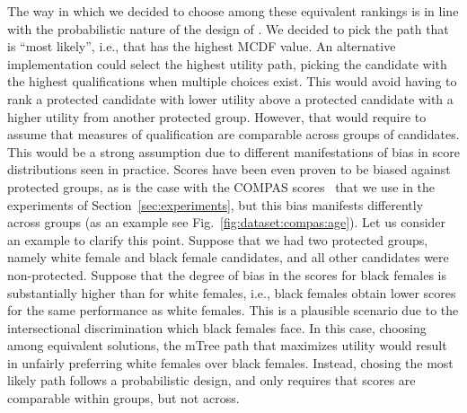 The way in which we decided to choose among these equivalent rankings is in line with the probabilistic nature of the design of \algoFAIR.
%
We decided to pick the path that is ``most likely'', i.e., that has the highest MCDF value.
%
An alternative implementation could select the highest utility path, picking the candidate with the highest qualifications when multiple choices exist.
%
This would avoid having to rank a protected candidate with lower utility above a protected candidate with a higher utility from another protected group.
%
However, that would require to assume that measures of qualification are comparable across groups of candidates.
%
This would be a strong assumption due to different manifestations of bias in score distributions seen in practice.
%
Scores have been even proven to be biased against protected groups, as is the case with the COMPAS scores~\cite{angwin_2016_machine} that we use in the experiments of Section~\ref{sec:experiments}, but this bias manifests differently across groups (as an example see Fig.~\ref{fig:dataset:compas:age}).
%
Let us consider an example to clarify this point.
%
Suppose that we had two protected groups, namely white female and black female candidates, and all other candidates were non-protected.
%
%
Suppose that the degree of bias in the scores for black females is substantially higher than for white females, i.e., black females obtain lower scores for the same performance as white females. This is a plausible scenario due to the intersectional discrimination which black females face.
%
In this case, choosing among equivalent solutions, the mTree path that maximizes utility would result in unfairly preferring white females over black females.
%
Instead, chosing the most likely path follows a probabilistic design, and only requires that scores are comparable within groups, but not across.
